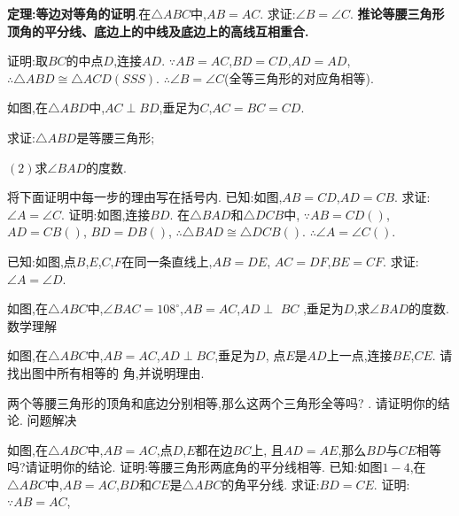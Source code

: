 \documentclass[cn,blue,12pt]{elegantbook}
\begin{document}
\begin{liti}[resume]
\item \textbf{定理:等边对等角的证明}.在\( \triangle ABC \)中,\( AB = AC \). 求证:\( \angle B = \angle C\). 
\textbf{推论等腰三角形顶角的平分线、底边上的中线及底边上的高线互相重合.} 
\begin{solution}
证明:取\( BC \)的中点\( D\),连接\( AD\). 
\( \because AB = AC\),\( BD = CD\),\( AD = AD\),
\( \therefore \triangle ABD \cong  \triangle ACD( SSS) \). 
\( \therefore \angle B = \angle C \)(全等三角形的对应角相等). 
\end{solution}
\item 如图,在\( \triangle ABD \)中,\( AC \perp BD\),垂足为\( C\),\( AC = BC = CD\). \\
    \begin{liti}[resume]
    \item 求证:\( \triangle ABD \)是等腰三角形;\\
    \item \(( 2) \)求\( \angle BAD \)的度数. \\
    \end{liti}
\item 将下面证明中每一步的理由写在括号内. 
已知:如图,\( AB = CD\),\( AD = CB\). 
求证:\( \angle  A =  \angle  C\). 
证明:如图,连接\( BD\). 
在\( \triangle BAD \)和\( \triangle DCB \)中,
\( \because AB = CD( )\),
\(AD = CB( )\),
\(BD = DB( )\),
\( \therefore \triangle BAD \cong  \triangle DCB( ) \). 
\( \therefore \angle A = \angle C( ) \). 
\item 已知:如图,点\(B\),\( E\),\( C\),\( F\)在同一条直线上,\( AB = DE\),
\(AC = DF\),\( BE = CF\). 
求证:\( \angle A = \angle D\). 
\item 如图,在\( \triangle ABC \)中,\( \angle BAC = 108 ^\circ \),\( AB = AC\),\( AD \perp \)
\(BC\)
,垂足为\( D\),求\( \angle  BAD \)的度数. 
数学理解
\item 如图,在\( \triangle ABC \)中,\( AB = AC\),\( AD \perp BC\),垂足为\( D\),
点\( E \)是\( AD \)上一点,连接\( BE\),\( CE\). 请找出图中所有相等的
角,并说明理由. 
\item 两个等腰三角形的顶角和底边分别相等,那么这两个三角形全等吗?
. 请证明你的结论. 
问题解决
\item 如图,在\( \triangle ABC \)中,\( AB = AC\),点\( D\),\( E \)都在边\( BC \)上,
且\( AD = AE\),那么\( BD \)与\( CE \)相等吗?请证明你的结论. 
证明:等腰三角形两底角的平分线相等. 
已知:如图\( 1-4\),在\( \triangle ABC \)中,\( AB = AC\),\( BD \)和\( CE \)是\( \triangle ABC \)的角平分线. 
求证:\( BD = CE\). 
证明:\( \because AB = AC\),

\end{liti}
\end{document}
